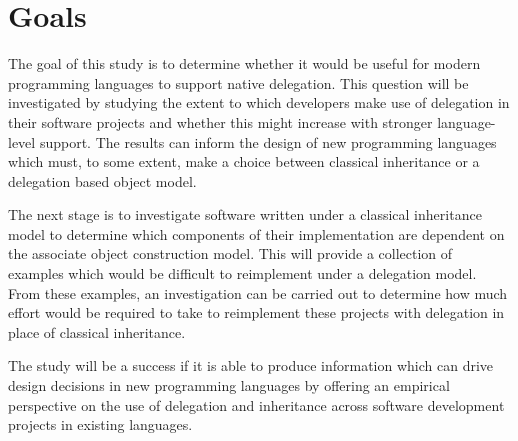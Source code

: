 \section{Goals}
The goal of this study is to determine whether it would be useful for modern programming languages to support native delegation. This question will be investigated by studying the extent to which developers make use of delegation in their software projects and whether this might increase with stronger language-level support. The results can inform the design of new programming languages which must, to some extent, make a choice between classical inheritance or a delegation based object model.
\newline

The next stage is to investigate software written under a classical inheritance model to determine which components of their implementation are dependent on the associate object construction model. This will provide a collection of examples which would be difficult to reimplement under a delegation model. From these examples, an investigation can be carried out to determine how much effort would be required to take to reimplement these projects with delegation in place of classical inheritance.
\newline

The study will be a success if it is able to produce information which can drive design decisions in new programming languages by offering an empirical perspective on the use of delegation and inheritance across software development projects in existing languages.